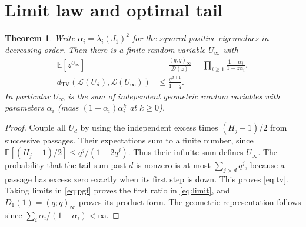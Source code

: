 \documentclass[11pt]{article}
\newtheorem{theorem}{Theorem}[section]
\theoremstyle{definition}\newtheorem{definition}[theorem]{Definition}
\newcommand{\Exp}{\mathbb E}
\newcommand{\TV}{d_{\mathrm{TV}}}
\begin{document}
\section{Limit law and optimal tail}
\begin{theorem}\label{thm:limit}
Write $\alpha_i=\lambda_i(J_1)^2$ for the squared positive eigenvalues in decreasing order. Then there is a finite random variable $U_\infty$ with
\begin{align}
 \Exp[z^{U_\infty}]&=\frac{(q;q)_\infty}{\mathcal D(z)}
 =\prod_{i\geq1}\frac{1-\alpha_i}{1-z\alpha_i},\label{eq:limit}\\
 \TV(\mathcal L(U_d),\mathcal L(U_\infty))&\leq\frac{q^{d+1}}{1-q}.\label{eq:tv}
\end{align}
In particular $U_\infty$ is the sum of independent geometric random variables with parameters $\alpha_i$ (mass $(1-\alpha_i)\alpha_i^k$ at $k\geq0$).
\end{theorem}
\begin{proof}
Couple all $U_d$ by using the independent excess times $(H_j-1)/2$ from successive passages. Their expectations sum to a finite number, since $\Exp[(H_j-1)/2]\leq q^j/(1-2q^j)$. Thus their infinite sum defines $U_\infty$. The probability that the tail sum past $d$ is nonzero is at most $\sum_{j>d}q^j$, because a passage has excess zero exactly when its first step is down. This proves \eqref{eq:tv}. Taking limits in \eqref{eq:pgf} proves the first ratio in \eqref{eq:limit}, and $D_1(1)=(q;q)_\infty$ proves its product form. The geometric representation follows since $\sum_i\alpha_i/(1-\alpha_i)<\infty$.
\end{proof}
\end{document}
